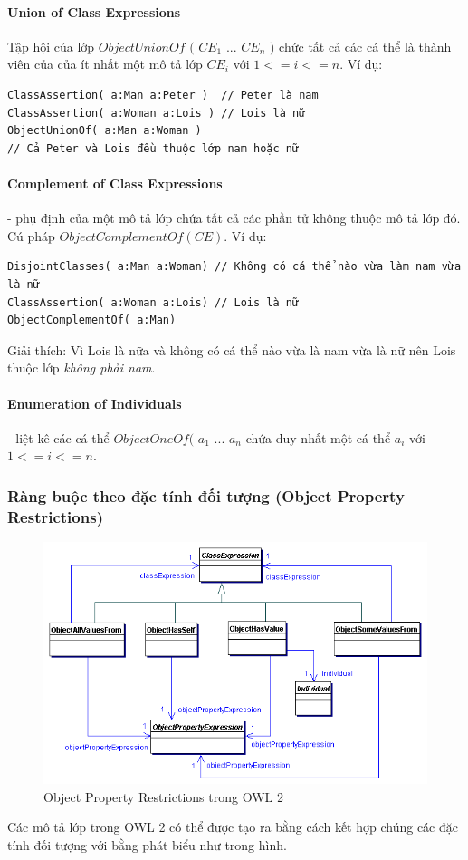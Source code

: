 \paragraph{Union of Class Expressions} Tập hội của lớp $ObjectUnionOf$ $($ $CE_{1}$ ... $CE_{n}$ $)$ chức tất cả các cá thể là thành viên của của ít nhất một mô tả lớp $CE_{i}$ với $1<=i<=n$. Ví dụ:
\begin{verbatim}
ClassAssertion( a:Man a:Peter )	 // Peter là nam
ClassAssertion( a:Woman a:Lois ) // Lois là nữ
ObjectUnionOf( a:Man a:Woman ) 
// Cả Peter và Lois đều thuộc lớp nam hoặc nữ
\end{verbatim}

\paragraph{Complement of Class Expressions} - phụ định của một mô tả lớp chứa tất cả các phần tử không thuộc mô tả lớp đó. Cú pháp $ObjectComplementOf(CE)$. Ví dụ:
\begin{verbatim}
DisjointClasses( a:Man a:Woman) // Không có cá thể nào vừa làm nam vừa là nữ
ClassAssertion( a:Woman a:Lois) // Lois là nữ
ObjectComplementOf( a:Man)
\end{verbatim}
Giải thích: Vì Lois là nữa và không có cá thể nào vừa là nam vừa là nữ nên Lois thuộc lớp \textit{không phải nam}.

\paragraph{Enumeration of Individuals} - liệt kê các cá thể $ObjectOneOf($ $a_{1}$ ... $a_{n}$ chứa duy nhất một cá thể $a_{i}$ với $1<=i<=n$. 

\subsubsection{Ràng buộc theo đặc tính đối tượng (Object Property Restrictions)}
\begin{figure}[h]
	\centering
	\includegraphics[width=120mm]{Figures/ce_1.png}
	\caption{Object Property Restrictions trong OWL 2\label{overflow}}
\end{figure}
Các mô tả lớp trong OWL 2 có thể được tạo ra bằng cách kết hợp chúng các đặc tính đối tượng với bằng phát biểu như trong hình.
